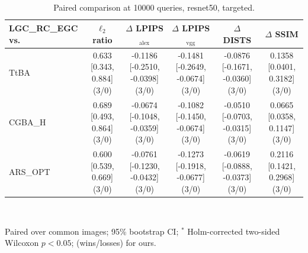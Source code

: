 \begin{table}[t]
\centering\footnotesize
\caption{Paired comparison at 10000 queries, resnet50, targeted.}
\begin{tabular}{lccccc}
\toprule
LGC\_RC\_EGC vs. & $\ell_2$ ratio & $\Delta$ LPIPS$_{\mathrm{alex}}$ & $\Delta$ LPIPS$_{\mathrm{vgg}}$ & $\Delta$ DISTS & $\Delta$ SSIM \\
\midrule
TtBA & 0.633 [0.343, 0.884] (3/0) & -0.1186 [-0.2510, -0.0398] (3/0) & -0.1481 [-0.2649, -0.0674] (3/0) & -0.0876 [-0.1671, -0.0360] (3/0) & 0.1358 [0.0401, 0.3182] (3/0) \\
CGBA\_H & 0.689 [0.493, 0.864] (3/0) & -0.0674 [-0.1048, -0.0359] (3/0) & -0.1082 [-0.1450, -0.0674] (3/0) & -0.0510 [-0.0703, -0.0315] (3/0) & 0.0665 [0.0358, 0.1147] (3/0) \\
ARS\_OPT & 0.600 [0.539, 0.669] (3/0) & -0.0761 [-0.1230, -0.0432] (3/0) & -0.1273 [-0.1918, -0.0677] (3/0) & -0.0619 [-0.0888, -0.0373] (3/0) & 0.2116 [0.1421, 0.2968] (3/0) \\
\bottomrule
\end{tabular}
\\[2pt]\parbox{\linewidth}{\scriptsize Paired over common images; 95\% bootstrap CI; $^{*}$ Holm-corrected two-sided Wilcoxon $p<0.05$; (wins/losses) for ours.}
\end{table}
